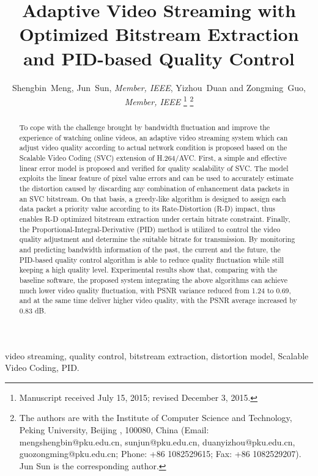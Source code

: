 \documentclass[journal]{IEEEtran}
\title{Adaptive Video Streaming with Optimized Bitstream Extraction and PID-based Quality Control}
\author{Shengbin~Meng, Jun~Sun, {\em Member, IEEE}, Yizhou~Duan and Zongming~Guo, {\em Member, IEEE} %
\thanks{Manuscript received July 15, 2015; revised December 3, 2015.}
\thanks{The authors are with the Institute of Computer Science and Technology, Peking University, Beijing%
, 100080, China (Email: mengshengbin@pku.edu.cn, sunjun@pku.edu.cn, duanyizhou@pku.edu.cn, guozongming@pku.edu.cn; Phone: +86 1082529615; Fax: +86 1082529207). Jun Sun is the corresponding author.}}
\begin{document}



\maketitle

\begin{abstract}
To cope with the challenge brought by bandwidth fluctuation and improve the experience of watching online videos, an adaptive video streaming system which can adjust video quality according to actual network condition is proposed based on the Scalable Video Coding (SVC) extension of H.264/AVC. First, a simple and effective linear error model is proposed and verified for quality scalability of SVC. The model exploits the linear feature of pixel value errors and can be used to accurately estimate the distortion caused by discarding any combination of enhancement data packets in an SVC bitstream. On that basis, a greedy-like algorithm is designed to assign each data packet a priority value according to its Rate-Distortion (R-D) impact, thus enables R-D optimized bitstream extraction under certain bitrate constraint. Finally, the Proportional-Integral-Derivative (PID) method is utilized to control the video quality adjustment and determine the suitable bitrate for transmission. By monitoring and predicting bandwidth information of the past, the current and the future, the PID-based quality control algorithm is able to reduce quality fluctuation while still keeping a high quality level. Experimental results show that, comparing with the baseline software, the proposed system integrating the above algorithms can achieve much lower video quality fluctuation, with PSNR variance reduced from 1.24 to 0.69, and at the same time deliver higher video quality, with the PSNR average increased by 0.83 dB.
\end{abstract}

\begin{IEEEkeywords}
video streaming, quality control, bitstream extraction, distortion model, Scalable Video Coding, PID.
\end{IEEEkeywords}



%
\IEEEpeerreviewmaketitle
\end{document}
